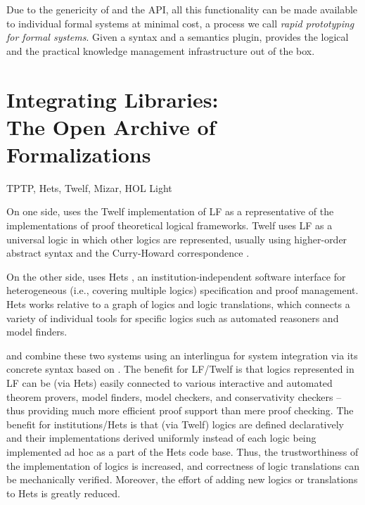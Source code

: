 Due to the genericity of {\mmt} and the {\mmt} API, all this functionality can be made available to individual formal systems at minimal cost, a process we call \emph{rapid prototyping for formal systems}.
Given a syntax and a semantics plugin, {\mmt} provides the logical and the practical knowledge management infrastructure out of the box.


\section{Integrating Libraries:\\The Open Archive of Formalizations}

TPTP, Hets, Twelf, Mizar, HOL Light

On one side,  uses the Twelf \cite{twelf} implementation of LF as a representative of the implementations of proof theoretical logical frameworks.
Twelf uses LF as a universal logic in which other logics are represented, usually using higher-order abstract syntax \cite{hoas} and the Curry-Howard correspondence \cite{curry,howard}.

On the other side,  uses Hets \cite{hets}, an institution-independent software interface for heterogeneous (i.e., covering multiple logics)
specification and proof management.
Hets works relative to a graph of logics and logic translations, which connects a variety of individual tools for specific logics such as automated reasoners and model finders.

 and  combine these two systems using {\mmt} an interlingua for system integration via its concrete syntax based on {\omdoc}.
The benefit for LF/Twelf is that logics represented in LF can be (via Hets) easily connected to various interactive and automated theorem provers, model finders, model checkers, and conservativity checkers -- thus providing much more efficient proof support than mere proof checking.
The benefit for institutions/Hets is that (via Twelf) logics are defined declaratively and their implementations derived uniformly instead of each logic being implemented ad hoc as a part of the Hets code base.
Thus, the trustworthiness of the implementation of logics is increased, and correctness of logic translations can be mechanically verified.
Moreover, the effort of adding new logics or translations to Hets is greatly reduced.


